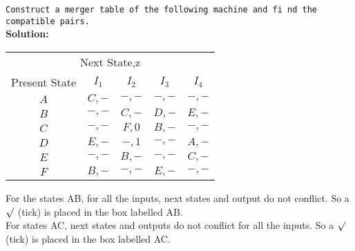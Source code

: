 \documentclass[9pt]{beamer}
\begin{document}
\begin{frame}
\hspace*{0.1cm} \texttt{\small{Construct a merger table of the following machine and fi nd the compatible pairs.}} \\

\vspace*{0.1cm}
\textbf{Solution:}\\

\vspace*{0.1cm}
\begin{center}
\begin{tabular}{ccccc}
\hline

\hline

\hline

\hline
  \multicolumn{5}{c}{{Next State,z}}\\
 \cline{2-5}
{Present State} & {$I_1$} & {$I_2$} & {$I_3$} & {$I_4$}\\
\hline
$A$ & $C, -$ & $-, -$ &  $-, -$   &  $-, -$\\
$B$ & $-, -$ & $C, -$ &  $D, -$   &  $E, -$\\
$C$ & $-, -$ & $F, 0$ &  $B, -$   &  $-, -$\\
$D$ & $E, -$ & $-, 1$ &  $-, -$   &  $A, -$\\
$E$ & $-, -$ & $B, -$ &  $-, -$   &  $C, -$\\
$F$ & $B, -$ & $-, -$ &  $E, -$   &  $-, -$\\
\hline

\hline

\hline

\hline
\end{tabular}
\end{center}

\vspace{0.2cm} 
\hspace*{0.5cm} For the states AB, for all the inputs, next states and output do not conflict. So a $\surd$ (tick) is placed in
the box labelled AB.\\
\hspace*{0.5cm} For states AC, next states and outputs do not conflict for all the inputs. So a $\surd$ (tick) is placed in the
box labelled AC.\\
\end{frame}
\end{document}

